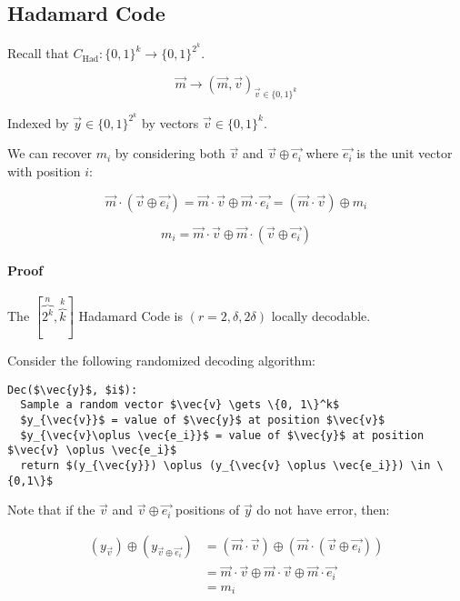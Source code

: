 \documentclass{idc_msc}
\begin{document}
\subsection{Hadamard Code}

Recall that \(C_{\text{Had}} : \{0,1\}^k \to \{0,1\}^{2^k}\).

\[\vec{m} \to (\vec{m}, \vec{v})_{\vec{v} \in \{0,1\}^k}\]

Indexed by \(\vec{y} \in \{0,1\}^{2^k}\) by vectors \(\vec{v} \in \{0,1\}^k\).


We can recover \(m_i\) by considering both \(\vec{v}\) and \(\vec{v} \oplus \vec{e_i}\) where \(\vec{e_i}\) is the unit vector with position \(i\):

\[
\vec{m} \cdot (\vec{v} \oplus \vec{e_i})
= \vec{m} \cdot \vec{v} \oplus \vec{m} \cdot \vec{e_i}
= (\vec{m} \cdot \vec{v}) \oplus m_i
\]

\[m_i = \vec{m} \cdot \vec{v} \oplus \vec{m} \cdot (\vec{v} \oplus \vec{e_i})\]

\paragraph{Proof}

The \([\overbrace{2^k}^{n},\overbrace{k}^{k}]\) Hadamard Code is \((r=2, \delta, 2\delta)\) locally decodable.

Consider the following randomized decoding algorithm:

\begin{lstlisting}[frame=L,mathescape=true,title={Local decoding Hadamard}]
Dec($\vec{y}$, $i$):
  Sample a random vector $\vec{v} \gets \{0, 1\}^k$
  $y_{\vec{v}}$ = value of $\vec{y}$ at position $\vec{v}$
  $y_{\vec{v}\oplus \vec{e_i}}$ = value of $\vec{y}$ at position $\vec{v} \oplus \vec{e_i}$
  return $(y_{\vec{y}}) \oplus (y_{\vec{v} \oplus \vec{e_i}}) \in \{0,1\}$
\end{lstlisting}

Note that if the \(\vec{v}\) and \(\vec{v} \oplus \vec{e_i}\) positions of \(\vec{y}\) do not have error, then:

\[
\begin{aligned}
  (y_{\vec{v}}) \oplus (y_{\vec{v} \oplus \vec{e_i}})
  &= (\vec{m} \cdot \vec{v}) \oplus (\vec{m} \cdot (\vec{v} \oplus \vec{e_i})) \\
  &= \vec{m} \cdot \vec{v} \oplus \vec{m} \cdot \vec{v} \oplus \vec{m} \cdot \vec{e_i} \\
  &= m_i
\end{aligned}
\]
\end{document}

